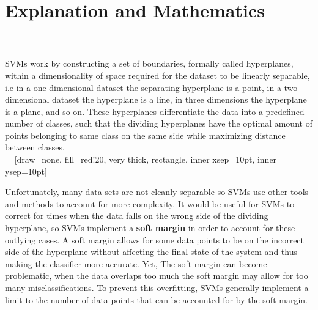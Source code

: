 \documentclass[svgnames]{report}
\begin{document}
    \section*{Explanation and Mathematics}
         \\ \\
        \indent SVMs work by constructing a set of boundaries, formally called hyperplanes, within a dimensionality of space required for the dataset to be linearly separable, i.e in a one dimensional dataset the separating hyperplane is a point, in a two dimensional dataset the hyperplane is a line, in three dimensions the hyperplane is a plane, and so on. These hyperplanes differentiate the data into a predefined number of classes, such that the dividing hyperplanes have the optimal amount of points belonging to same class on the same side while maximizing distance between classes.\\
         = [draw=none, fill=red!20, very thick,
            rectangle, inner xsep=10pt, inner ysep=10pt]
        \indent Unfortunately, many data sets are not cleanly separable so SVMs use other tools and methods to account for more complexity. It would be useful for SVMs to correct for times when the data falls on the wrong side of the dividing hyperplane, so SVMs implement a \textbf{soft margin} in order to account for these outlying cases. A soft margin allows for some data points to be on the incorrect side of the hyperplane without affecting the final state of the system and thus making the classifier more accurate. Yet, The soft margin can become problematic, when the data overlaps too much the soft margin may allow for too many misclassifications. To prevent this overfitting, SVMs generally implement a limit to the number of data points that can be accounted for by the soft margin. \\
\end{document}
